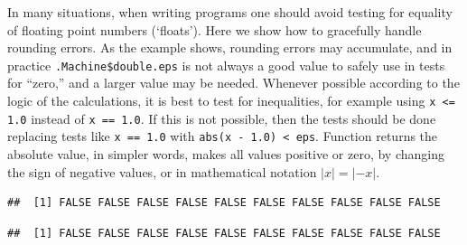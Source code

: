 \documentclass[krantz2]{krantz}\usepackage{knitr}
\begin{document}
\begin{warningbox}
In many situations, when writing programs one should avoid testing for equality of floating point numbers (`floats'). Here we show how to gracefully handle rounding errors. As the example shows, rounding errors may accumulate, and in practice \verb|.Machine$double.eps| is not always a good value to safely use in tests for ``zero,'' and a larger value may be needed. Whenever possible according to the logic of the calculations, it is best to test for inequalities, for example using \verb|x <= 1.0| instead of \verb|x == 1.0|. If this is not possible, then the tests should be done replacing tests like \verb|x == 1.0| with \verb|abs(x - 1.0) < eps|. Function  returns the absolute value, in simpler words, makes all values positive or zero, by changing the sign of negative values, or in mathematical notation $|x| = |-x|$.

\begin{knitrout}\footnotesize
{}\color{fgcolor}\begin{kframe}
\begin{alltt}
 \hlopt{==}  
\end{alltt}
\begin{verbatim}
##  [1] FALSE FALSE FALSE FALSE FALSE FALSE FALSE FALSE FALSE FALSE
\end{verbatim}
\begin{alltt}
 \hlopt{<}  
\end{alltt}
\begin{verbatim}
##  [1] FALSE FALSE FALSE FALSE FALSE FALSE FALSE FALSE FALSE FALSE
\end{verbatim}
\end{kframe}
\end{knitrout}


\end{warningbox}
\end{document}
